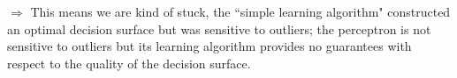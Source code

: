 \documentclass[a4paper,blends,pdf,colorBG,slideColor]{prosper}
\begin{document}
\vspace{.1in}
$\Rightarrow$ This means we are kind of stuck, the ``simple learning algorithm" constructed an optimal decision
surface but was sensitive to outliers; the perceptron is not sensitive to outliers but its learning algorithm provides no
guarantees with respect to the quality of the decision surface.
\es
\end{document}
